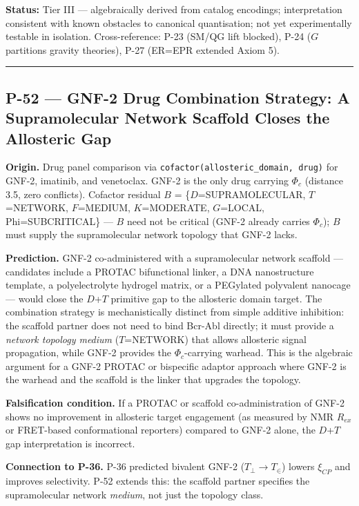\documentclass[12pt,a4paper]{article}
\begin{document}
\textbf{Status:} Tier III --- algebraically derived from catalog encodings; interpretation consistent with known obstacles to canonical quantisation; not yet experimentally testable in isolation. Cross-reference: P-23 (SM/QG lift blocked), P-24 ($G$ partitions gravity theories), P-27 (ER=EPR extended Axiom 5).

\begin{center}
\rule{0.5\textwidth}{0.4pt}
\end{center}

\subsection{P-52 --- GNF-2 Drug Combination Strategy: A Supramolecular Network Scaffold Closes the Allosteric Gap}

\textbf{Origin.} Drug panel comparison via \texttt{cofactor(allosteric\_domain, drug)} for GNF-2, imatinib, and venetoclax. GNF-2 is the only drug carrying $\Phi_c$ (distance 3.5, zero conflicts). Cofactor residual $B$ = \{$D$=SUPRAMOLECULAR, $T$=NETWORK, $F$=MEDIUM, $K$=MODERATE, $G$=LOCAL, Phi=SUBCRITICAL\} --- $B$ need not be critical (GNF-2 already carries $\Phi_c$); $B$ must supply the supramolecular network topology that GNF-2 lacks.

\textbf{Prediction.} GNF-2 co-administered with a supramolecular network scaffold --- candidates include a PROTAC bifunctional linker, a DNA nanostructure template, a polyelectrolyte hydrogel matrix, or a PEGylated polyvalent nanocage --- would close the $D$+$T$ primitive gap to the allosteric domain target. The combination strategy is mechanistically distinct from simple additive inhibition: the scaffold partner does not need to bind Bcr-Abl directly; it must provide a \emph{network topology medium} ($T$=NETWORK) that allows allosteric signal propagation, while GNF-2 provides the $\Phi_c$-carrying warhead. This is the algebraic argument for a GNF-2 PROTAC or bispecific adaptor approach where GNF-2 is the warhead and the scaffold is the linker that upgrades the topology.

\textbf{Falsification condition.} If a PROTAC or scaffold co-administration of GNF-2 shows no improvement in allosteric target engagement (as measured by NMR $R_{ex}$ or FRET-based conformational reporters) compared to GNF-2 alone, the $D$+$T$ gap interpretation is incorrect.

\textbf{Connection to P-36.} P-36 predicted bivalent GNF-2 ($T_\perp \to T_\in$) lowers $\xi_{CP}$ and improves selectivity. P-52 extends this: the scaffold partner specifies the supramolecular network \emph{medium}, not just the topology class.
\end{document}
